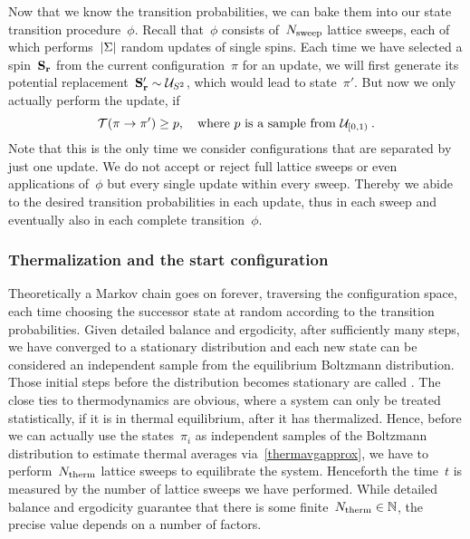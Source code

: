 Now that we know the transition probabilities, we can bake them into our state
transition procedure~$\phi$. Recall that~$\phi$ consists of~$N_{\mathrm{sweep}}$ lattice
sweeps, each of which performs~$\abs{\Sigma}$ random updates of single spins.
Each time we have selected a spin~$\mathbf{S}_{\mathbf{r}}$ from the current configuration~$\pi$
for an update, we will first generate its potential replacement~$\mathbf{S}'_{\mathbf{r}} \sim
\mathcal{U}_{S^2}$, which would lead to state~$\pi'$. But now we only actually perform
the update, if
%
\begin{equation}
  \mathcal{T}(\pi \to \pi') \ge p, \quad \text{where } p
    \text{ is a sample from } \mathcal{U}_{[0,1)}\:.
\end{equation}
%
Note that this is the only time we consider configurations that are separated by
just one update. We do not accept or reject full lattice sweeps or even
applications of~$\phi$ but every single update within every sweep. Thereby we
abide to the desired transition probabilities in each update, thus in each sweep
and eventually also in each complete transition~$\phi$.

\subsubsection{Thermalization and the start configuration}

Theoretically a Markov chain goes on forever, traversing the configuration
space, each time choosing the successor state at random according to the
transition probabilities. Given detailed balance and ergodicity, after
sufficiently many steps, we have converged to a stationary distribution and each
new state can be considered an independent sample from the equilibrium Boltzmann
distribution. Those initial steps before the distribution becomes stationary are
called . The close ties to thermodynamics are obvious,
where a system can only be treated statistically, if it is in thermal
equilibrium, \ie{} after it has thermalized. Hence, before we can actually use
the states~$\pi_i$ as independent samples of the Boltzmann distribution to
estimate thermal averages via~\eqref{thermavgapprox}, we have to
perform~$N_{\mathrm{therm}}$ lattice sweeps to equilibrate the system. Henceforth the
time~$t$ is measured by the number of lattice sweeps we have performed. While
detailed balance and ergodicity guarantee that there is some finite~$N_{\mathrm{therm}} \in
\mathbb{N}$, the precise value depends on a number of factors.


